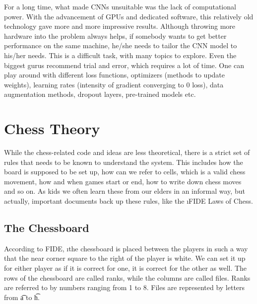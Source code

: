 For a long time, what made CNNs unsuitable was the lack of computational power. With the advancement of GPUs and dedicated software, this relatively old technology gave more and more impressive results. Although throwing more hardware into the problem always helps, if somebody wants to get better performance on the same machine, he/she needs to tailor the CNN model to his/her needs. This is a difficult task, with many topics to explore. Even the biggest gurus recommend trial and error, which requires a lot of time. One can play around with different loss functions, optimizers (methods to update weights), learning rates (intensity of gradient converging to 0 loss), data augmentation methods, dropout layers, pre-trained models etc.




\section{Chess Theory} \label{sec:chess-theory}

While the chess-related code and ideas are less theoretical, there is a strict set of rules that needs to be known to understand the system. This includes how the board is supposed to be set up, how can we refer to cells, which is a valid chess movement, how and when games start or end, how to write down chess moves and so on. As kids we often learn these from our elders in an informal way, but actually, important documents back up these rules, like the \i{FIDE Laws of Chess}\cite{fide}.



\subsection{The Chessboard}

According to FIDE, \i{the chessboard is placed between the players in such a way that the near corner square to the right of the player is white}\cite{fide}. We can set it up for either player as if it is correct for one, it is correct for the other as well. The rows of the chessboard are called ranks, while the columns are called files. Ranks are referred to by numbers ranging from 1 to 8. Files are represented by letters from \t{a} to \t{h}.

